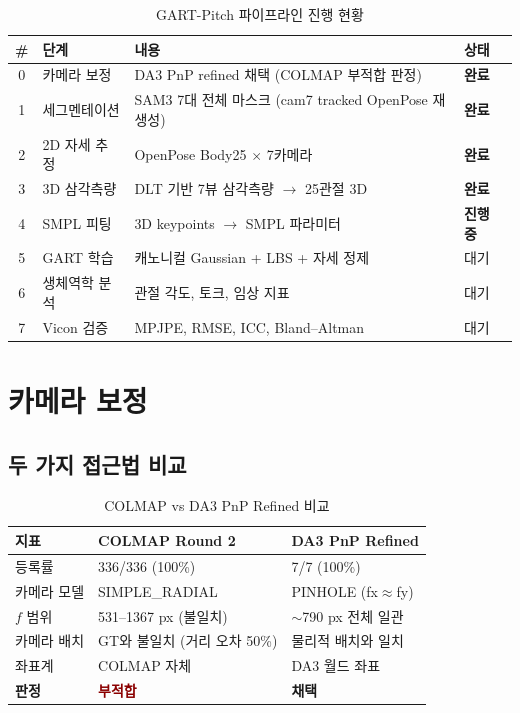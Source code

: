 \documentclass[11pt, a4paper]{report}
\begin{document}
\begin{table}[H]
\centering
\caption{GART-Pitch 파이프라인 진행 현황}
\renewcommand{\arraystretch}{1.4}
\begin{tabularx}{\textwidth}{clXl}
\toprule
\textbf{\#} & \textbf{단계} & \textbf{내용} & \textbf{상태} \\
\midrule
0 & 카메라 보정 & DA3 PnP refined 채택 (COLMAP 부적합 판정) & \textcolor{thmgreen}{\textbf{완료}} \\
1 & 세그멘테이션 & SAM3 7대 전체 마스크 (cam7 tracked OpenPose 재생성) & \textcolor{thmgreen}{\textbf{완료}} \\
2 & 2D 자세 추정 & OpenPose Body25 $\times$ 7카메라 & \textcolor{thmgreen}{\textbf{완료}} \\
3 & 3D 삼각측량 & DLT 기반 7뷰 삼각측량 $\rightarrow$ 25관절 3D & \textcolor{thmgreen}{\textbf{완료}} \\
4 & SMPL 피팅 & 3D keypoints $\rightarrow$ SMPL 파라미터 & \textcolor{noteorange}{\textbf{진행 중}} \\
5 & GART 학습 & 캐노니컬 Gaussian + LBS + 자세 정제 & 대기 \\
6 & 생체역학 분석 & 관절 각도, 토크, 임상 지표 & 대기 \\
7 & Vicon 검증 & MPJPE, RMSE, ICC, Bland--Altman & 대기 \\
\bottomrule
\end{tabularx}
\end{table}


\chapter{카메라 보정}

\section{두 가지 접근법 비교}

\begin{table}[H]
\centering
\caption{COLMAP vs DA3 PnP Refined 비교}
\renewcommand{\arraystretch}{1.3}
\begin{tabularx}{\textwidth}{lXX}
\toprule
\textbf{지표} & \textbf{COLMAP Round 2} & \textbf{DA3 PnP Refined} \\
\midrule
등록률 & 336/336 (100\%) & 7/7 (100\%) \\
카메라 모델 & SIMPLE\_RADIAL & PINHOLE (fx$\approx$fy) \\
$f$ 범위 & 531--1367 px (불일치) & $\sim$790 px 전체 일관 \\
카메라 배치 & GT와 불일치 (거리 오차 50\%) & 물리적 배치와 일치 \\
좌표계 & COLMAP 자체 & DA3 월드 좌표 \\
\textbf{판정} & \textcolor{darkred}{\textbf{부적합}} & \textcolor{thmgreen}{\textbf{채택}} \\
\bottomrule
\end{tabularx}
\end{table}
\end{document}
